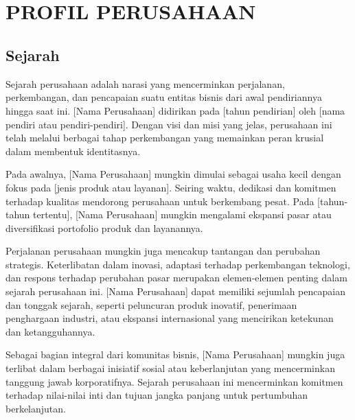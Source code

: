 
\chapter[PROFIL PERUSAHAAN]{\\ PROFIL PERUSAHAAN}

\section{Sejarah \perusahaan}
Sejarah perusahaan adalah narasi yang mencerminkan perjalanan, perkembangan, dan pencapaian suatu entitas bisnis dari awal pendiriannya hingga saat ini. [Nama Perusahaan] didirikan pada [tahun pendirian] oleh [nama pendiri atau pendiri-pendiri]. Dengan visi dan misi yang jelas, perusahaan ini telah melalui berbagai tahap perkembangan yang memainkan peran krusial dalam membentuk identitasnya.

Pada awalnya, [Nama Perusahaan] mungkin dimulai sebagai usaha kecil dengan fokus pada [jenis produk atau layanan]. Seiring waktu, dedikasi dan komitmen terhadap kualitas mendorong perusahaan untuk berkembang pesat. Pada [tahun-tahun tertentu], [Nama Perusahaan] mungkin mengalami ekspansi pasar atau diversifikasi portofolio produk dan layanannya.

Perjalanan perusahaan mungkin juga mencakup tantangan dan perubahan strategis. Keterlibatan dalam inovasi, adaptasi terhadap perkembangan teknologi, dan respons terhadap perubahan pasar merupakan elemen-elemen penting dalam sejarah perusahaan ini. [Nama Perusahaan] dapat memiliki sejumlah pencapaian dan tonggak sejarah, seperti peluncuran produk inovatif, penerimaan penghargaan industri, atau ekspansi internasional yang mencirikan ketekunan dan ketangguhannya.

Sebagai bagian integral dari komunitas bisnis, [Nama Perusahaan] mungkin juga terlibat dalam berbagai inisiatif sosial atau keberlanjutan yang mencerminkan tanggung jawab korporatifnya. Sejarah perusahaan ini mencerminkan komitmen terhadap nilai-nilai inti dan tujuan jangka panjang untuk pertumbuhan berkelanjutan.

